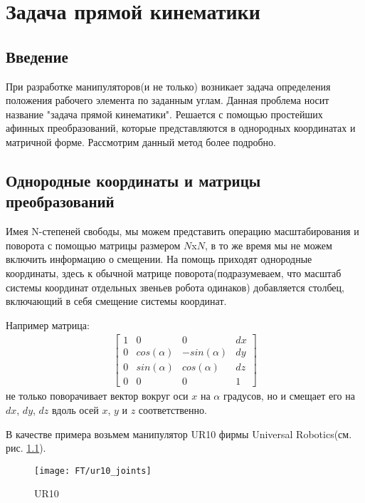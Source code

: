 \chapter{Задача прямой кинематики} \label{ch:3}

\section{Введение} \label{sect3_1}
При разработке манипуляторов(и не только) возникает задача определения положения рабочего элемента по заданным углам. Данная проблема носит название "задача прямой кинематики". Решается с помощью простейших афинных преобразований, которые представляются в однородных координатах и матричной форме. Рассмотрим данный метод более подробно.

\section{Однородные координаты и матрицы преобразований}
Имея N-степеней свободы, мы можем представить операцию масштабирования и поворота с помощью матрицы размером $N$x$N$, в то же время мы не можем включить информацию о смещении. На помощь приходят однородные координаты, здесь к обычной матрице поворота(подразумеваем, что масштаб системы координат отдельных звеньев робота одинаков) добавляется столбец, включающий в себя смещение системы координат.

Например матрица:
\begin{align*}
	\begin{bmatrix}
		1	&	0				&	0				&	dx\\
		0	&	cos(\alpha)		&	-sin(\alpha)	&	dy\\
		0	&	sin(\alpha)		&	cos(\alpha)		&	dz\\
		0	&	0				&	0				&	1
	\end{bmatrix}
\end{align*}
не только поворачивает вектор вокруг оси $x$ на $\alpha$ градусов, но и смещает его на $dx$, $dy$, $dz$ вдоль осей $x$, $y$ и $z$ соответственно.

В качестве примера возьмем манипулятор UR10 фирмы Universal Robotics(см. рис. \ref{fig:ft_sheme1}). 
\begin{figure}[ht]
	\centering
	\texttt{[image: FT/ur10\_joints]}
	\caption{UR10}
	\label{fig:ft_sheme1}
\end{figure}

